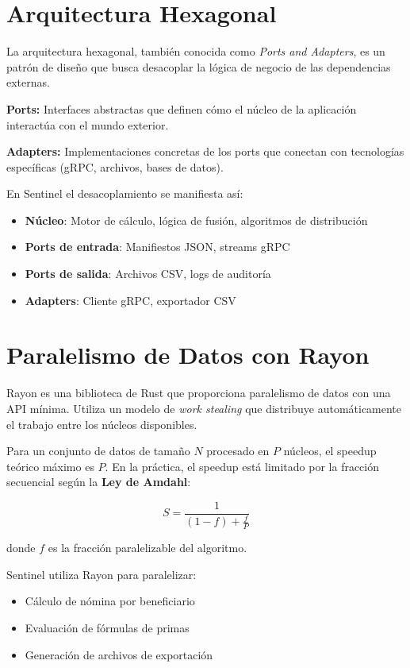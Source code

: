 \section{Arquitectura Hexagonal}

La arquitectura hexagonal, también conocida como \textit{Ports and Adapters}, es un patrón de diseño que busca desacoplar la lógica de negocio de las dependencias externas.

\textbf{Ports:} Interfaces abstractas que definen cómo el núcleo de la aplicación interactúa con el mundo exterior.

\textbf{Adapters:} Implementaciones concretas de los ports que conectan con tecnologías específicas (gRPC, archivos, bases de datos).

En Sentinel el desacoplamiento se manifiesta así:

\begin{itemize}
    \item \textbf{Núcleo}: Motor de cálculo, lógica de fusión, algoritmos de distribución
    \item \textbf{Ports de entrada}: Manifiestos JSON, streams gRPC
    \item \textbf{Ports de salida}: Archivos CSV, logs de auditoría
    \item \textbf{Adapters}: Cliente gRPC, exportador CSV
\end{itemize}

\section{Paralelismo de Datos con Rayon}

Rayon es una biblioteca de Rust que proporciona paralelismo de datos con una API mínima. Utiliza un modelo de \textit{work stealing} que distribuye automáticamente el trabajo entre los núcleos disponibles.

Para un conjunto de datos de tamaño $N$ procesado en $P$ núcleos, el speedup teórico máximo es $P$. En la práctica, el speedup está limitado por la fracción secuencial según la \textbf{Ley de Amdahl}:

\[
S = \frac{1}{(1 - f) + \frac{f}{P}}
\]

donde $f$ es la fracción paralelizable del algoritmo.

Sentinel utiliza Rayon para paralelizar:

\begin{itemize}
    \item Cálculo de nómina por beneficiario
    \item Evaluación de fórmulas de primas
    \item Generación de archivos de exportación
\end{itemize}

